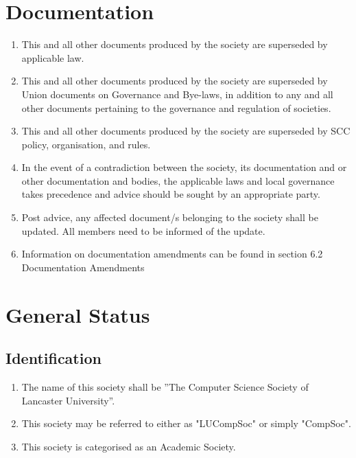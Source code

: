 \documentclass[parskip=half]{scrartcl}
\begin{document}
    \clearpage
    \section{Documentation}
        \label{documentation}

\begin{enumerate}
    \item This and all other documents produced by the society are superseded by applicable law.

    \item This and all other documents produced by the society are superseded by Union documents on Governance and Bye-laws, in addition to any and all other documents pertaining to the governance and regulation of societies.

    \item This and all other documents produced by the society are superseded by SCC policy, organisation, and rules.
    
    \item In the event of a contradiction between the society, its documentation and or other documentation and bodies, the applicable laws and local governance takes precedence and advice should be sought by an appropriate party. 

    \item Post advice, any affected document/s belonging to the society shall be updated. All members need to be informed of the update.

\item Information on documentation amendments can be found in section 6.2 Documentation Amendments

\end{enumerate}

    \clearpage
    \section{General Status}
        \label{general}
        \subsection{Identification}
            \label{general--identification}
            \begin{enumerate}
                \item The name of this society shall be ”The Computer Science Society of Lancaster University”.
                \item This society may be referred to either as "LUCompSoc" or simply "CompSoc".
                \item This society is categorised as an Academic Society.
            \end{enumerate}
\end{document}
